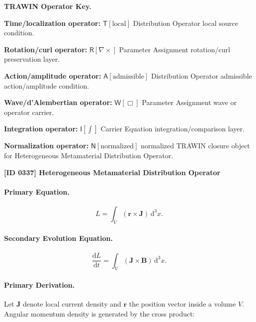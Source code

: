 \par\vspace{0.45\baselineskip}
\noindent\begin{minipage}[t]{\linewidth}
\begingroup
\small
\raggedright
\textbf{TRAWIN Operator Key.}\par
\noindent\textbf{Time/localization operator:} $\mathsf{T}\!\left[\mathrm{local}\right]$ Distribution Operator local source condition.\par
\noindent\textbf{Rotation/curl operator:} $\mathsf{R}\!\left[\nabla\times\right]$ Parameter Assignment rotation/curl preservation layer.\par
\noindent\textbf{Action/amplitude operator:} $\mathsf{A}\!\left[\mathrm{admissible}\right]$ Distribution Operator admissible action/amplitude condition.\par
\noindent\textbf{Wave/d'Alembertian operator:} $\mathsf{W}\!\left[\Box\right]$ Parameter Assignment wave or operator carrier.\par
\noindent\textbf{Integration operator:} $\mathsf{I}\!\left[\int\right]$ Carrier Equation integration/comparison layer.\par
\noindent\textbf{Normalization operator:} $\mathsf{N}\!\left[\mathrm{normalized}\right]$ normalized TRAWIN closure object for Heterogeneous Metamaterial Distribution Operator.\par
\endgroup
\end{minipage}

\clearpage
\noindent\textbf{[ID 0337] Heterogeneous Metamaterial Distribution Operator}\par
\vspace{0.35em}
\paragraph{Primary Equation.}
\begin{equation}
L
=
\int_V
(\mathbf{r}\times\mathbf{J})
\,\mathrm{d}^3x .
\end{equation}

\paragraph{Secondary Evolution Equation.}
\begin{equation}
\frac{\mathrm{d}L}{\mathrm{d}t}
=
\int_V
(\mathbf{J}\times\mathbf{B})
\,\mathrm{d}^3x .
\end{equation}

\paragraph{Primary Derivation.}
Let $\mathbf{J}$ denote local current density and $\mathbf{r}$ the position vector inside a volume $V$.  
Angular momentum density is generated by the cross product:

